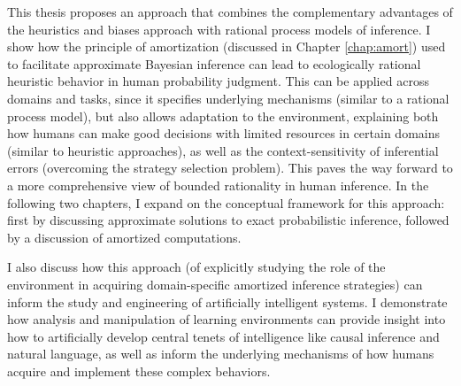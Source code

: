 This thesis proposes an approach that combines the complementary advantages of the heuristics and biases approach with rational process models of inference. I show how the principle of amortization (discussed in Chapter \ref{chap:amort}) used to facilitate approximate Bayesian inference can lead to ecologically rational heuristic behavior in human probability judgment. This can be applied across domains and tasks, since it specifies underlying mechanisms (similar to a rational process model), but also allows adaptation to the environment, explaining both how humans can make good decisions with limited resources in certain domains (similar to heuristic approaches), as well as the context-sensitivity of inferential errors (overcoming the strategy selection problem). This paves the way forward to a more comprehensive view of bounded rationality in human inference. In the following two chapters, I expand on the conceptual framework for this approach: first by discussing approximate solutions to exact probabilistic inference, followed by a discussion of amortized computations.

I also discuss how this approach (of explicitly studying the role of the environment in acquiring domain-specific amortized inference strategies) can inform the study and engineering of artificially intelligent systems. I demonstrate how analysis and manipulation of learning environments can provide insight into how to artificially develop central tenets of intelligence like causal inference and natural language, as well as inform the underlying mechanisms of how humans acquire and implement these complex behaviors.
